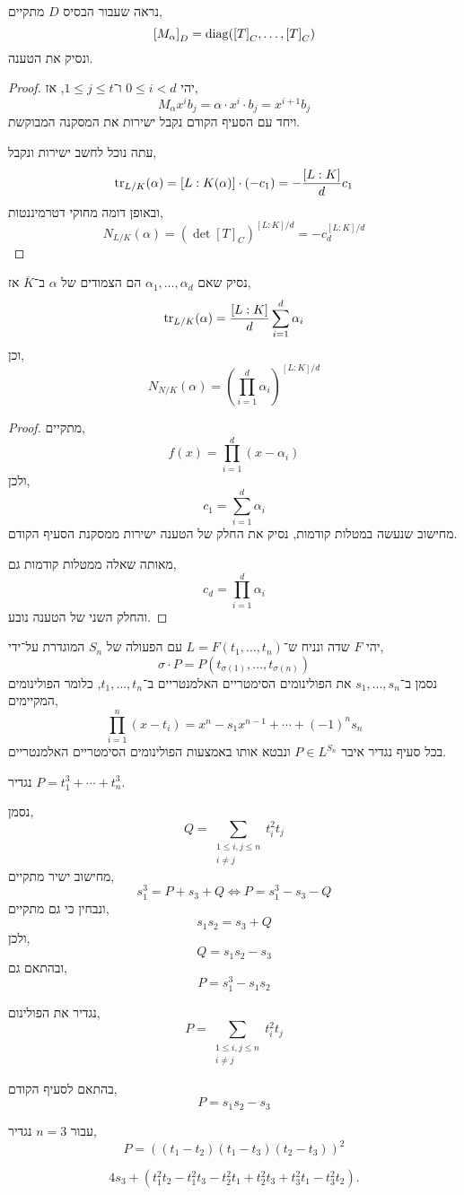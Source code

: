 \subquestion{}
נראה שעבור הבסיס $D$ מתקיים,
\[
	{[ M_{\alpha} ]}_D
	= \operatorname{diag}({[T]}_C, \ldots, {[T]}_C)
\]
ונסיק את הטענה.
\begin{proof}
	יהי $0 \le i < d$ ו־$1 \le j \le t$, אז,
	\[
		M_{\alpha} x^i b_j
		= \alpha \cdot x^i \cdot b_j
		= x^{i + 1} b_j
	\]
	ויחד עם הסעיף הקודם נקבל ישירות את המסקנה המבוקשת.

	עתה נוכל לחשב ישירות ונקבל,
	\[
		\operatorname{tr}_{L / K}(\alpha)
		= [L : K(\alpha)] \cdot (-c_1)
		= - \frac{[L : K]}{d} c_1
	\]
	ובאופן דומה מחוקי דטרמיננטות,
	\[
		N_{L / K}(\alpha)
		= {(\det {[T]}_C)}^{[L : K] / d}
		= -c_d^{[L : K] / d}
	\]
\end{proof}

\subquestion{}
נסיק שאם $\alpha_1, \ldots, \alpha_d$ הם הצמודים של $\alpha$ ב־$\overline{K}$ אז,
\[
	\operatorname{tr}_{L / K}(\alpha) = \frac{[L : K]}{d} \sum_{i = 1}^d \alpha_i
\]
וכן,
\[
	N_{N / K}(\alpha)
	= {\left(\prod_{i = 1}^d \alpha_i\right)}^{[L : K] / d}
\]
\begin{proof}
	מתקיים,
	\[
		f(x) = \prod_{i = 1}^d (x - \alpha_i)
	\]
	ולכן,
	\[
		c_1
		= \sum_{i = 1}^d \alpha_i
	\]
	מחישוב שנעשה במטלות קודמות, נסיק את החלק של הטענה ישירות ממסקנת הסעיף הקודם.

	מאותה שאלה ממטלות קודמות גם,
	\[
		c_d
		= \prod_{i = 1}^d \alpha_i
	\]
	והחלק השני של הטענה נובע.
\end{proof}

\question{}
יהי $F$ שדה ונניח ש־$L = F(t_1, \ldots, t_n)$ עם הפעולה של $S_n$ המוגדרת על־ידי,
\[
	\sigma \cdot P
	= P(t_{\sigma(1)}, \ldots, t_{\sigma(n)})
\]
נסמן ב־$s_1, \ldots, s_n$ את הפולינומים הסימטריים האלמנטריים ב־$t_1, \ldots, t_n$,
כלומר הפולינומים המקיימים,
\[
	\prod_{i = 1}^n (x - t_i)
	= x^n - s_1 x^{n - 1} + \cdots + {(-1)}^n s_n
\]
בכל סעיף נגדיר איבר $P \in L^{S_n}$ ונבטא אותו באמצעות הפולינומים הסימטריים האלמנטריים.

\subquestion{}
נגדיר $P = t_1^3 + \cdots + t_n^3$.
\begin{solution}
	נסמן,
	\[
		Q = \sum_{\substack{1 \le i, j \le n \\ i \ne j}} t_i^2 t_j
	\]
	מחישוב ישיר מתקיים,
	\[
		s_1^3
		= P + s_3 + Q
		\iff P = s_1^3 - s_3 - Q
	\]
	ונבחין כי גם מתקיים,
	\[
		s_1 s_2
		= s_3 + Q
	\]
	ולכן,
	\[
		Q = s_1 s_2 - s_3
	\]
	ובהתאם גם,
	\[
		P
		= s_1^3 - s_1 s_2
	\]
\end{solution}

\subquestion{}
נגדיר את הפולינום,
\[
	P
	= \sum_{\substack{1 \le i, j \le n \\ i \ne j}} t_i^2 t_j
\]
\begin{solution}
	בהתאם לסעיף הקודם,
	\[
		P = s_1 s_2 - s_3
	\]
\end{solution}

\subquestion{}
עבור $n = 3$ נגדיר,
\[
	P = {((t_1 - t_2) (t_1 - t_3) (t_2 - t_3))}^2
\]
\begin{solution}
	\[
		4 s_3
		+ (t_1^2 t_2 - t_1^2 t_3 - t_2^2 t_1 + t_2^2 t_3 + t_3^2 t_1 - t_3^2 t_2)
	.\]
\end{solution}


